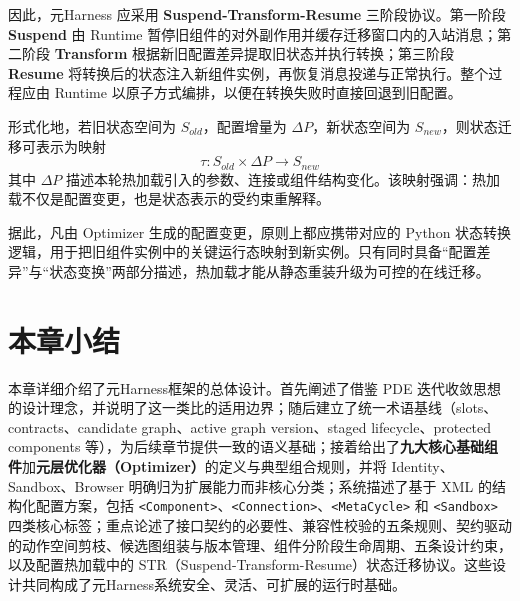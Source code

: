 因此，元Harness 应采用 \textbf{Suspend-Transform-Resume} 三阶段协议。第一阶段 \textbf{Suspend} 由 Runtime 暂停旧组件的对外副作用并缓存迁移窗口内的入站消息；第二阶段 \textbf{Transform} 根据新旧配置差异提取旧状态并执行转换；第三阶段 \textbf{Resume} 将转换后的状态注入新组件实例，再恢复消息投递与正常执行。整个过程应由 Runtime 以原子方式编排，以便在转换失败时直接回退到旧配置。

形式化地，若旧状态空间为 $S_{old}$，配置增量为 $\Delta P$，新状态空间为 $S_{new}$，则状态迁移可表示为映射
\[
\tau: S_{old} \times \Delta P \to S_{new}
\]
其中 $\Delta P$ 描述本轮热加载引入的参数、连接或组件结构变化。该映射强调：热加载不仅是配置变更，也是状态表示的受约束重解释。

据此，凡由 Optimizer 生成的配置变更，原则上都应携带对应的 Python 状态转换逻辑，用于把旧组件实例中的关键运行态映射到新实例。只有同时具备“配置差异”与“状态变换”两部分描述，热加载才能从静态重装升级为可控的在线迁移。

\section{本章小结}

本章详细介绍了元Harness框架的总体设计。首先阐述了借鉴 PDE 迭代收敛思想的设计理念，并说明了这一类比的适用边界；随后建立了统一术语基线（slots、contracts、candidate graph、active graph version、staged lifecycle、protected components 等），为后续章节提供一致的语义基础；接着给出了\textbf{九大核心基础组件}加\textbf{元层优化器（Optimizer）}的定义与典型组合规则，并将 Identity、Sandbox、Browser 明确归为扩展能力而非核心分类；系统描述了基于 XML 的结构化配置方案，包括 \texttt{<Component>}、\texttt{<Connection>}、\texttt{<MetaCycle>} 和 \texttt{<Sandbox>} 四类核心标签；重点论述了接口契约的必要性、兼容性校验的五条规则、契约驱动的动作空间剪枝、候选图组装与版本管理、组件分阶段生命周期、五条设计约束，以及配置热加载中的 STR（Suspend-Transform-Resume）状态迁移协议。这些设计共同构成了元Harness系统安全、灵活、可扩展的运行时基础。
